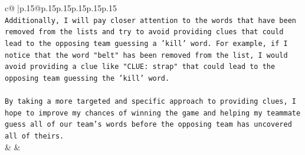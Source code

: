 \documentclass{article}
\begin{document}
{\begin{supertabular}{c@{$\;$}|p{.15\linewidth}@{}p{.15\linewidth}p{.15\linewidth}p{.15\linewidth}p{.15\linewidth}p{.15\linewidth}}
{{{\\ 
\texttt{Additionally, I will pay closer attention to the words that have been removed from the lists and try to avoid providing clues that could lead to the opposing team guessing a 'kill' word. For example, if I notice that the word "belt" has been removed from the list, I would avoid providing a clue like "CLUE: strap" that could lead to the opposing team guessing the 'kill' word.} \\
\\ 
\texttt{By taking a more targeted and specific approach to providing clues, I hope to improve my chances of winning the game and helping my teammate guess all of our team's words before the opposing team has uncovered all of theirs.} \\
            }
        }
    }
    & & \\ \\

\end{supertabular}
}
\end{document}
